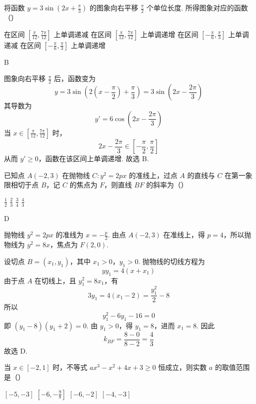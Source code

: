 \begin{problem}
将函数 \( y = 3\sin \left(2x + \frac{\pi}{3}\right) \) 的图象向右平移 \( \frac{\pi}{2} \) 个单位长度. 所得图象对应的函数（\quad）

\choices
    {在区间 \( \left[\frac{\pi}{12}, \frac{7\pi}{12}\right] \) 上单调递减}
    {在区间 \(\left[\frac{\pi}{12}, \frac{7\pi}{12}\right]\) 上单调递增}
    {在区间 \( \left[-\frac{\pi}{6}, \frac{\pi}{3}\right] \) 上单调递减}
    {在区间 \( \left[-\frac{\pi}{6},\frac{\pi}{3}\right] \) 上单调递增}
\end{problem}

\begin{answer}
B
\end{answer}

\begin{solution}
图象向右平移 \(\frac\pi2\) 后，函数变为
\[
y=3\sin\left(2\left(x-\frac\pi2\right)+\frac\pi3\right)=3\sin\left(2x-\frac{2\pi}{3}\right)
\]
其导数为
\[
y'=6\cos\left(2x-\frac{2\pi}{3}\right)
\]
当 \(x\in\left[\frac\pi{12},\frac{7\pi}{12}\right]\) 时，
\[
2x-\frac{2\pi}{3}\in\left[-\frac\pi2,\frac\pi2\right]
\]
从而 \(y'\geqslant0\)，函数在该区间上单调递增. 故选 B.
\end{solution}

\begin{problem}
已知点 \(A(-2,3)\) 在抛物线 \(C: y^{2} = 2px\) 的准线上，过点 \(A\) 的直线与 \(C\) 在第一象限相切于点 \(B\)，记 \(C\) 的焦点为 \(F\)，则直线 \(BF\) 的斜率为（\quad）

\choices
    {\(\frac{1}{2}\)}
    {\(\frac{2}{3}\)}
    {\(\frac{3}{4}\)}
    {\(\frac{4}{3}\)}
\end{problem}

\begin{answer}
D
\end{answer}

\begin{solution}
抛物线 \(y^2=2px\) 的准线为 \(x=-\frac p2\). 由点 \(A(-2,3)\) 在准线上，得 \(p=4\)，所以抛物线为 \(y^2=8x\)，焦点为 \(F(2,0)\).

设切点 \(B=(x_1,y_1)\)，其中 \(x_1>0\)，\(y_1>0\). 抛物线的切线方程为
\[
yy_1=4(x+x_1)
\]
由于点 \(A\) 在切线上，且 \(y_1^2=8x_1\)，有
\[
3y_1=4(x_1-2)=\frac{y_1^2}{2}-8
\]
所以
\[
y_1^2-6y_1-16=0
\]
即 \((y_1-8)(y_1+2)=0\). 由 \(y_1>0\)，得 \(y_1=8\)，进而 \(x_1=8\). 因此
\[
k_{BF}=\frac{8-0}{8-2}=\frac43
\]
故选 D.
\end{solution}

\begin{problem}
当 \(x \in [-2, 1]\) 时，不等式 \(ax^3 - x^2 + 4x + 3 \geqslant 0\) 恒成立，则实数 \(a\) 的取值范围是（\quad）

\choices
    {\([-5, - 3]\)}
    {\(\left[-6, -\frac{9}{8}\right]\)}
    {\([-6, - 2]\)}
    {\([-4, - 3]\)}
\end{problem}


